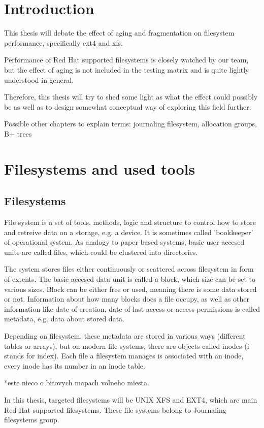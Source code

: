 \documentclass[
  color, %
  table, %
  lof,   %
  lot,   %
]{fithesis3}
\begin{document}
\chapter{Introduction}
This thesis will debate the effect of aging and fragmentation on filesystem performance, specifically ext4 and xfs.

Performance of Red Hat supported filesystems is closely watched by our team, but the effect of aging is not included in the testing matrix and is quite lightly understood in general.

Therefore, this thesis will try to shed some light as what the effect could possibly be as well as to design somewhat conceptual way of exploring this field further.

Possible other chapters to explain terms: journaling filesystem, allocation groups, B+ trees

\chapter{Filesystems and used tools}
\section{Filesystems}
File system is a set of tools, methods, logic and structure to control how to store and retreive data on a storage, e.g. a device. It is sometimes called 'bookkeeper' of operational system.
As analogy to paper-based systems, basic user-accesed units are called files, which could be clustered into directories.

The system stores files either continuously or scattered across filesystem in form of extents. The basic accesed data unit is called a block, which size can be set to various sizes. Block can be either free or used, meaning there is some data stored or not. Information about how many blocks does a file occupy, as well as other information like date of creation, date of last access or access permissions is called metadata, e.g. data about stored data.

Depending on filesystem, these metadata are stored in various ways (different tables or arrays), but on modern file systems, there are objects called inodes (i stands for index). Each file a filesystem manages is associated with an inode, every inode has its number in an inode table.

*este nieco o bitovych mapach volneho miesta.

In this thesis, targeted filesystems will be UNIX XFS and EXT4, which are main Red Hat supported filesystems. These file systems belong to Journaling filesystems group.
\end{document}
